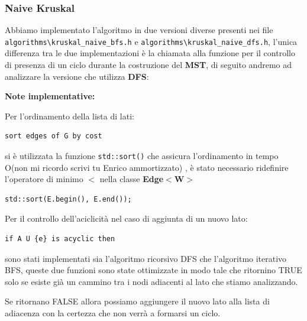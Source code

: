 \documentclass[]{article}
\begin{document}
\subsubsection{Naive Kruskal}
\begin{flushleft}
Abbiamo implementato l'algoritmo in due versioni diverse presenti nei file \verb|algorithms\kruskal_naive_bfs.h| e \verb|algorithms\kruskal_naive_dfs.h|, l'unica differenza tra le due implementazioni è la chiamata alla funzione per il controllo di presenza di un ciclo durante la costruzione del \textbf{MST}, di seguito andremo ad analizzare la versione che utilizza \textbf{DFS}:

\lstset{language=c++, style=mystyle}


\textbf{Note implementative:}

\medskip
Per l'ordinamento della lista di lati:

\begin{lstlisting}
sort edges of G by cost
\end{lstlisting}

\smallskip
si è utilizzata la funzione \verb|std::sort()| che assicura l'ordinamento in tempo O(non mi ricordo scrivi tu Enrico ammortizzato)%
, è stato necessario ridefinire l'operatore di minimo \textbf{$<$} nella classe \textbf{Edge$<$W$>$}
 
\lstset{language=c++, style=mystyle, firstnumber=3} 	 	
\begin{lstlisting}
std::sort(E.begin(), E.end());
\end{lstlisting}

\medskip
Per il controllo dell'aciclicità nel caso di aggiunta di un nuovo lato:

\begin{lstlisting}
if A U {e} is acyclic then
\end{lstlisting}

\smallskip
sono stati implementati sia l'algoritmo ricorsivo DFS che l'algoritmo iterativo BFS, queste due funzioni sono state ottimizzate in modo tale che ritornino TRUE solo se esiste già un cammino tra i nodi adiacenti al lato che stiamo analizzando.

Se ritornano FALSE allora possiamo aggiungere il nuovo lato alla lista di adiacenza con la certezza che non verrà a formarsi un ciclo.


\end{flushleft}
\end{document}
